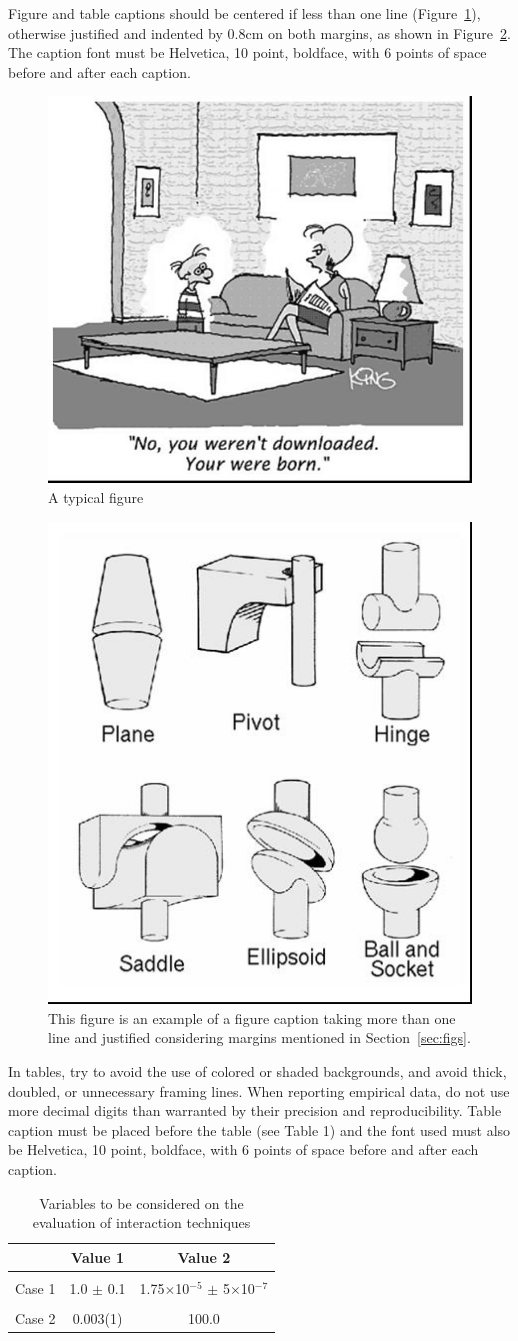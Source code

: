 \documentclass[12pt]{article}
\begin{document}
Figure and table captions should be centered if less than one line
(Figure~\ref{fig:exampleFig1}), otherwise justified and indented by 0.8cm on
both margins, as shown in Figure~\ref{fig:exampleFig2}. The caption font must
be Helvetica, 10 point, boldface, with 6 points of space before and after each
caption.

\begin{figure}[ht]
\centering
\includegraphics[width=.5\textwidth]{fig1.jpg}
\caption{A typical figure}
\label{fig:exampleFig1}
\end{figure}

\begin{figure}[ht]
\centering
\includegraphics[width=.3\textwidth]{fig2.jpg}
\caption{This figure is an example of a figure caption taking more than one
  line and justified considering margins mentioned in Section~\ref{sec:figs}.}
\label{fig:exampleFig2}
\end{figure}

In tables, try to avoid the use of colored or shaded backgrounds, and avoid
thick, doubled, or unnecessary framing lines. When reporting empirical data,
do not use more decimal digits than warranted by their precision and
reproducibility. Table caption must be placed before the table (see Table 1)
and the font used must also be Helvetica, 10 point, boldface, with 6 points of
space before and after each caption.

\begin{table}[ht]
\centering
\caption{Variables to be considered on the evaluation of interaction
  techniques}
\label{tab:exTable1}
\smallskip
\begin{tabular}{|l|c|c|}
\hline
& Value 1 & Value 2\\[0.5ex]
\hline
&&\\[-2ex]
Case 1 & 1.0 $\pm$ 0.1 & 1.75$\times$10$^{-5}$ $\pm$ 5$\times$10$^{-7}$\\[0.5ex]
\hline
&&\\[-2ex]
Case 2 & 0.003(1) & 100.0\\[0.5ex]
\hline
\end{tabular}
\end{table}
\end{document}
